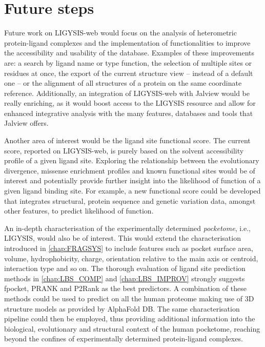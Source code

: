 \section{Future steps}


Future work on LIGYSIS-web would focus on the analysis of heterometric protein-ligand complexes and the implementation of functionalities to improve the accessibility and usability of the database. Examples of these improvements are: a search by ligand name or type function, the selection of multiple sites or residues at once, the export of the current structure view -- instead of a default one -- or the alignment of all structures of a protein on the same coordinate reference. Additionally, an integration of LIGYSIS-web with Jalview would be really enriching, as it would boost access to the LIGYSIS resource and allow for enhanced integrative analysis with the many features, databases and tools that Jalview offers.

Another area of interest would be the ligand site functional score. The current score, reported on LIGYSIS-web, is purely based on the solvent accessibility profile of a given ligand site. Exploring the relationship between the evolutionary divergence, missense enrichment profiles and known functional sites would be of interest and potentially provide further insight into the likelihood of function of a given ligand binding site. For example, a new functional score could be developed that integrates structural, protein sequence and genetic variation data, amongst other features, to predict likelihood of function.

An in-depth characterisation of the experimentally determined \textit{pocketome}, i.e., LIGYSIS, would also be of interest. This would extend the characterisation introduced in \autoref{chap:FRAGSYS} to include features such as pocket surface area, volume, hydrophobicity, charge, orientation relative to the main axis or centroid, interaction type and so on. The thorough evaluation of ligand site prediction methods in \autoref{chap:LBS_COMP} and \autoref{chap:LBS_IMPROV} strongly suggests fpocket, PRANK and P2Rank as the best predictors. A combination of these methods could be used to predict on all the human proteome making use of 3D structure models as provided by AlphaFold DB. The same characterisation pipeline could then be employed, thus providing additional information into the biological, evolutionary and structural context of the human pocketome, reaching beyond the confines of experimentally determined protein-ligand complexes.

